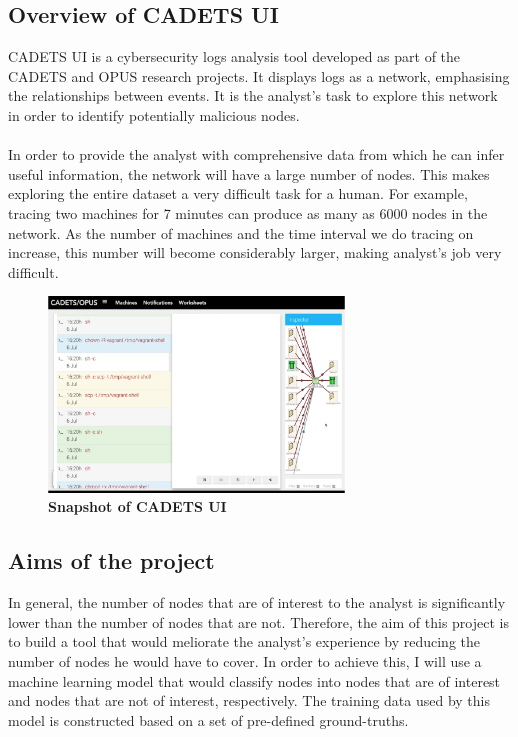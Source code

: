 \documentclass[12pt,a4paper,twoside,openright]{report}
\begin{document}
\subsection{Overview of CADETS UI}\label{1.1.1}
CADETS UI is a cybersecurity logs analysis tool developed as part of the CADETS and OPUS research projects. It displays logs as a network, emphasising the relationships between events. It is the analyst's task to explore this network in order to identify potentially malicious nodes.
\\ \\
In order to provide the analyst with comprehensive data from which he can infer useful information, the network will have a large number of nodes. This makes exploring the entire dataset a very difficult task for a human.  For example, tracing two machines for 7 minutes can produce as many as 6000 nodes in the network.  As the number of machines and the time interval we do tracing on increase, this number will become considerably larger, making analyst's job very difficult. 
\begin{figure}[H]
	\caption{\bf Snapshot of CADETS UI}
	\centering
	\includegraphics[width=0.7\textwidth]{graphics/CADETS}
\end{figure}

\subsection{Aims of the project}
In general, the number of nodes that are of interest to the analyst is significantly lower than the number of nodes that are not. Therefore, the aim of this project is to build a tool that would meliorate the analyst's experience by reducing the number of nodes he would have to cover. In order to achieve this, I will use a machine learning model that would classify nodes into nodes that are of interest and nodes that are not of interest, respectively. The training data used by this model is constructed based on a set of pre-defined ground-truths. 
\end{document}
